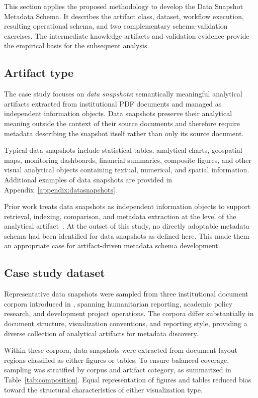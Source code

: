 \documentclass{article}
\begin{document}
This section applies the proposed methodology to develop the Data Snapshot Metadata Schema. It describes the artifact class, dataset, workflow execution, resulting operational schema, and two complementary schema-validation exercises. The intermediate knowledge artifacts and validation evidence provide the empirical basis for the subsequent analysis.

\subsection{Artifact type}

The case study focuses on \emph{data snapshots}: semantically meaningful analytical artifacts extracted from institutional PDF documents and managed as independent information objects. Data snapshots preserve their analytical meaning outside the context of their source documents and therefore require metadata describing the snapshot itself rather than only its source document.

Typical data snapshots include statistical tables, analytical charts, geospatial maps, monitoring dashboards, financial summaries, composite figures, and other visual analytical objects containing textual, numerical, and spatial information. Additional examples of data snapshots are provided in Appendix~\ref{appendix:datasnapshots}.

Prior work treats data snapshots as independent information objects to support retrieval, indexing, comparison, and metadata extraction at the level of the analytical artifact~\citep{dy2026}. At the outset of this study, no directly adoptable metadata schema had been identified for data snapshots as defined here. This made them an appropriate case for artifact-driven metadata schema development.

\subsection{Case study dataset}

Representative data snapshots were sampled from three institutional document corpora introduced in \cite{dy2026}, spanning humanitarian reporting, academic policy research, and development project operations. The corpora differ substantially in document structure, visualization conventions, and reporting style, providing a diverse collection of analytical artifacts for metadata discovery.

Within these corpora, data snapshots were extracted from document layout regions classified as either figures or tables. To ensure balanced coverage, sampling was stratified by corpus and artifact category, as summarized in Table~\ref{tab:composition}. Equal representation of figures and tables reduced bias toward the structural characteristics of either visualization type.
\end{document}

